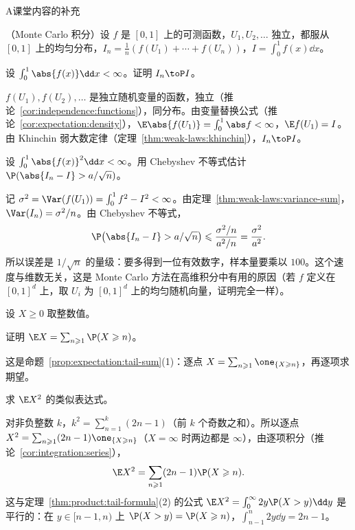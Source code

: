 \begin{exercises}{A}{课堂内容的补充}
\item\label{ex:weak-laws:A3} （Monte Carlo 积分）设 $f$ 是 $[0,1]$ 上的可测函数，$U_1,U_2,\dots$ 独立，都服从 $[0,1]$ 上的均匀分布，$I_n=\frac1n(f(U_1)+\cdots+f(U_n))$，$I=\int_0^1f(x)\dd x$。
\begin{questions}
\item 设 $\int_0^1\abs{f(x)}\dd x<\infty$。证明 $I_n\toP I$。
\begin{solution}
$f(U_1),f(U_2),\dots$ 是独立随机变量的函数，独立（推论~\ref{cor:independence:functions}），同分布。由变量替换公式（推论~\ref{cor:expectation:density}），$\E\abs{f(U_1)}=\int_0^1\abs f<\infty$，$\E f(U_1)=I$。由 Khinchin 弱大数定律（定理~\ref{thm:weak-laws:khinchin}），$I_n\toP I$。
\end{solution}
\item 设 $\int_0^1\abs{f(x)}^2\dd x<\infty$。用 Chebyshev 不等式估计 $\P(\abs{I_n-I}>a/\sqrt n)$。
\begin{solution}
记 $\sigma^2=\Var(f(U_1))=\int_0^1f^2-I^2<\infty$。由定理~\ref{thm:weak-laws:variance-sum}，$\Var(I_n)=\sigma^2/n$。由 Chebyshev 不等式，
\[
\P\bigl(\abs{I_n-I}>a/\sqrt n\bigr)\leqslant\frac{\sigma^2/n}{a^2/n}=\frac{\sigma^2}{a^2}.
\]
所以误差是 $1/\sqrt n$ 的量级：要多得到一位有效数字，样本量要乘以 $100$。这个速度与维数无关，这是 Monte Carlo 方法在高维积分中有用的原因（若 $f$ 定义在 $[0,1]^d$ 上，取 $U_i$ 为 $[0,1]^d$ 上的均匀随机向量，证明完全一样）。
\end{solution}
\end{questions}

\item\label{ex:weak-laws:A4} 设 $X\geqslant0$ 取整数值。
\begin{questions}
\item 证明 $\E X=\sum_{n\geqslant1}\P(X\geqslant n)$。
\begin{solution}
这是命题~\ref{prop:expectation:tail-sum}(1)：逐点 $X=\sum_{n\geqslant1}\one_{\{X\geqslant n\}}$，再逐项求期望。
\end{solution}
\item 求 $\E X^2$ 的类似表达式。
\begin{solution}
对非负整数 $k$，$k^2=\sum_{n=1}^k(2n-1)$（前 $k$ 个奇数之和）。所以逐点 $X^2=\sum_{n\geqslant1}(2n-1)\one_{\{X\geqslant n\}}$（$X=\infty$ 时两边都是 $\infty$），由逐项积分（推论~\ref{cor:integration:series}），
\[
\E X^2=\sum_{n\geqslant1}(2n-1)\P(X\geqslant n).
\]
这与定理~\ref{thm:product:tail-formula}(2) 的公式 $\E X^2=\int_0^\infty2y\P(X>y)\dd y$ 是平行的：在 $y\in[n-1,n)$ 上 $\P(X>y)=\P(X\geqslant n)$，$\int_{n-1}^n2y\dd y=2n-1$。
\end{solution}
\end{questions}


\end{exercises}
